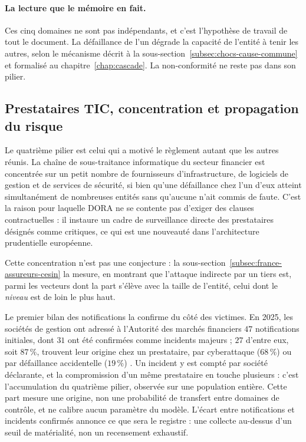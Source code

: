 \paragraph{La lecture que le mémoire en fait.} Ces cinq domaines ne sont pas indépendants, et
c'est l'hypothèse de travail de tout le document. La défaillance de l'un dégrade la capacité de
l'entité à tenir les autres, selon le mécanisme décrit à la
sous-section~\ref{subsec:chocs-cause-commune} et formalisé au chapitre~\ref{chap:cascade}. La
non-conformité ne reste pas dans son pilier.

\subsection{Prestataires TIC, concentration et propagation du risque}

Le quatrième pilier est celui qui a motivé le règlement autant que les autres réunis. La chaîne
de sous-traitance informatique du secteur financier est concentrée sur un petit nombre de
fournisseurs d'infrastructure, de logiciels de gestion et de services de sécurité, si bien qu'une
défaillance chez l'un d'eux atteint simultanément de nombreuses entités sans qu'aucune n'ait
commis de faute. C'est la raison pour laquelle DORA ne se contente pas d'exiger des clauses
contractuelles : il instaure un cadre de surveillance directe des prestataires désignés comme
critiques, ce qui est une nouveauté dans l'architecture prudentielle européenne.

Cette concentration n'est pas une conjecture : la sous-section~\ref{subsec:france-assureurs-cesin}
la mesure, en montrant que l'attaque indirecte par un tiers est, parmi les vecteurs dont la part
s'élève avec la taille de l'entité, celui dont le \emph{niveau} est de loin le plus haut.

Le premier bilan des notifications la confirme du côté des victimes. En
2025, les sociétés de gestion ont adressé à l'Autorité des marchés financiers $47$
notifications initiales, dont $31$ ont été confirmées comme incidents majeurs ; $27$ d'entre
eux, soit $87\,\%$, trouvent leur origine chez un prestataire, par cyberattaque ($68\,\%$) ou
par défaillance accidentelle ($19\,\%$) \citep{amf2026incidents}. Un incident y est compté par
société déclarante, et la compromission d'un même prestataire en touche plusieurs : c'est
l'accumulation du quatrième pilier, observée sur une population entière. Cette part mesure une
origine, non une probabilité de transfert entre domaines de contrôle, et ne calibre aucun
paramètre du modèle. L'écart entre notifications et incidents confirmés annonce ce que
sera le registre : une collecte au-dessus d'un seuil de matérialité, non un recensement
exhaustif.

